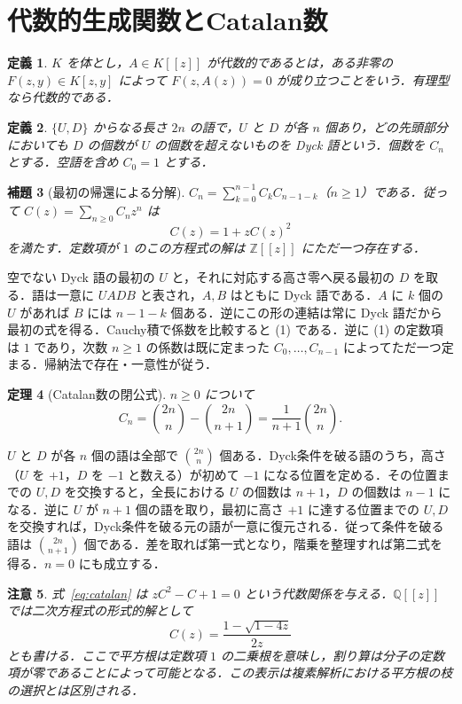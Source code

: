 \documentclass[a5paper,10pt,onecolumn]{jsarticle}
\makeatletter
\theoremstyle{mathnotetheorem}
\newtheorem{theorem}{定理}[section]
\newtheorem{definition}[theorem]{定義}
\newtheorem{lemma}[theorem]{補題}
\newtheorem{remark}[theorem]{注意}
\renewcommand{\proofname}{証明}
\renewenvironment{proof}[1][\proofname]{%
  \par\pushQED{\qed}\normalfont\topsep4\p@\@plus2\p@\relax
  \trivlist\item[\hskip\labelsep\bfseries #1]\ignorespaces
}{\popQED\endtrivlist\@endpefalse}
\makeatother
\begin{document}
\section{代数的生成関数とCatalan数}
\begin{definition}
$K$ を体とし，$A\in K[[z]]$ が\emph{代数的}であるとは，ある非零の $F(z,y)\in K[z,y]$ によって $F(z,A(z))=0$ が成り立つことをいう．有理型なら代数的である．
\end{definition}
\begin{definition}
$\{U,D\}$ からなる長さ $2n$ の語で，$U$ と $D$ が各 $n$ 個あり，どの先頭部分においても $D$ の個数が $U$ の個数を超えないものを Dyck 語という．個数を $C_n$ とする．空語を含め $C_0=1$ とする．
\end{definition}
\begin{lemma}[最初の帰還による分解]\label{lem:catalanrec}
$C_n=\sum_{k=0}^{n-1}C_kC_{n-1-k}$（$n\ge1$）である．従って $C(z)=\sum_{n\ge0}C_nz^n$ は
\[
 C(z)=1+zC(z)^2
 \tag{1}\label{eq:catalan}
\]
を満たす．定数項が $1$ のこの方程式の解は $\mathbb Z[[z]]$ にただ一つ存在する．
\end{lemma}
\begin{proof}
空でない Dyck 語の最初の $U$ と，それに対応する高さ零へ戻る最初の $D$ を取る．語は一意に $UADB$ と表され，$A,B$ はともに Dyck 語である．$A$ に $k$ 個の $U$ があれば $B$ には $n-1-k$ 個ある．逆にこの形の連結は常に Dyck 語だから最初の式を得る．Cauchy積で係数を比較すると (1) である．逆に (1) の定数項は $1$ であり，次数 $n\ge1$ の係数は既に定まった $C_0,\dots,C_{n-1}$ によってただ一つ定まる．帰納法で存在・一意性が従う．
\end{proof}

\begin{theorem}[Catalan数の閉公式]\label{thm:catalan}
$n\ge0$ について
\[
 C_n=\binom{2n}{n}-\binom{2n}{n+1}
 =\frac{1}{n+1}\binom{2n}{n}.
\]
\end{theorem}
\begin{proof}
$U$ と $D$ が各 $n$ 個の語は全部で $\binom{2n}{n}$ 個ある．Dyck条件を破る語のうち，高さ（$U$ を $+1$，$D$ を $-1$ と数える）が初めて $-1$ になる位置を定める．その位置までの $U,D$ を交換すると，全長における $U$ の個数は $n+1$，$D$ の個数は $n-1$ になる．逆に $U$ が $n+1$ 個の語を取り，最初に高さ $+1$ に達する位置までの $U,D$ を交換すれば，Dyck条件を破る元の語が一意に復元される．従って条件を破る語は $\binom{2n}{n+1}$ 個である．差を取れば第一式となり，階乗を整理すれば第二式を得る．$n=0$ にも成立する．
\end{proof}

\begin{remark}
式~\eqref{eq:catalan} は $zC^2-C+1=0$ という代数関係を与える．$\mathbb Q[[z]]$ では二次方程式の形式的解として
\[
 C(z)=\frac{1-\sqrt{1-4z}}{2z}
\]
とも書ける．ここで平方根は定数項 $1$ の二乗根を意味し，割り算は分子の定数項が零であることによって可能となる．この表示は複素解析における平方根の枝の選択とは区別される．
\end{remark}
\end{document}

